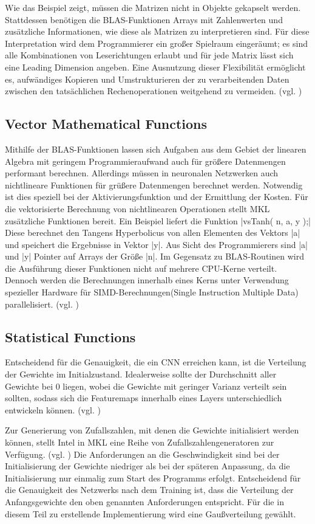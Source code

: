 \documentclass[../main.tex]{subfiles}
\begin{document}
Wie das Beispiel zeigt, müssen die Matrizen nicht in Objekte gekapselt werden. Stattdessen benötigen die BLAS-Funktionen Arrays mit Zahlenwerten und zusätzliche Informationen, wie diese als Matrizen zu interpretieren sind. Für diese Interpretation wird dem Programmierer ein großer Spielraum eingeräumt; es sind alle Kombinationen von Leserichtungen erlaubt und für jede Matrix lässt sich eine Leading Dimension angeben. Eine Ausnutzung dieser Flexibilität ermöglicht es, aufwändiges Kopieren und Umstrukturieren der zu verarbeitenden Daten zwischen den tatsächlichen Rechenoperationen weitgehend zu vermeiden. (vgl. \cite{MKLdevReference})

\subsection{Vector Mathematical Functions}
Mithilfe der BLAS-Funktionen lassen sich Aufgaben aus dem Gebiet der linearen Algebra mit geringem Programmieraufwand auch für größere Datenmengen performant berechnen. Allerdings müssen in neuronalen Netzwerken auch nichtlineare Funktionen für grüßere Datenmengen berechnet werden. Notwendig ist dies speziell bei der Aktivierungsfunktion und der Ermittlung der Kosten. Für die vektorisierte Berechnung von nichtlinearen Operationen stellt MKL zusätzliche Funktionen bereit. Ein Beispiel liefert die Funktion |vsTanh( n, a, y );| Diese berechnet den Tangens Hyperbolicus von allen Elementen des Vektors |a| und speichert die Ergebnisse in Vektor |y|. Aus Sicht des Programmierers sind |a| und |y| Pointer auf Arrays der Größe |n|. Im Gegensatz zu BLAS-Routinen wird die Ausführung dieser Funktionen nicht auf mehrere CPU-Kerne verteilt. Dennoch werden die Berechnungen innerhalb eines Kerns unter Verwendung spezieller Hardware für SIMD-Berechnungen(Single Instruction Multiple Data) parallelisiert. (vgl. \cite{MKLdevReference})

\subsection{Statistical Functions}
Entscheidend für die Genauigkeit, die ein CNN erreichen kann, ist die Verteilung der Gewichte im Initialzustand. Idealerweise sollte der Durchschnitt aller Gewichte bei \(0\) liegen, wobei die Gewichte mit geringer Varianz verteilt sein sollten, sodass sich die Featuremaps innerhalb eines Layers unterschiedlich entwickeln können. (vgl. \cite{neuralNetworksAndDeepLearning})

Zur Generierung von Zufallszahlen, mit denen die Gewichte initialisiert werden können, stellt Intel in MKL eine Reihe von Zufallszahlengeneratoren zur Verfügung. (vgl. \cite{MKLdevReference}) Die Anforderungen an die Geschwindigkeit sind bei der Initialisierung der Gewichte niedriger als bei der späteren Anpassung, da die Initialisierung nur einmalig zum Start des Programms erfolgt. Entscheidend für die Genauigkeit des Netzwerks nach dem Training ist, dass die Verteilung der Anfangsgewichte den oben genannten Anforderungen entspricht. Für die in diesem Teil zu erstellende Implementierung wird eine Gaußverteilung gewählt. 
\end{document}
